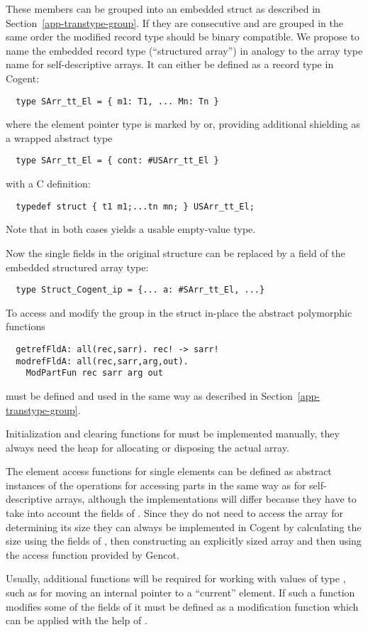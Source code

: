 These members can be grouped into an embedded struct as described in Section~\ref{app-transtype-group}. If they
are consecutive and are grouped in the same order the modified record type should be binary compatible.
We propose to name the embedded record type  (``structured array'') in analogy to the
array type name for self-descriptive arrays. It can either be defined as a record type in Cogent:
\begin{verbatim}
  type SArr_tt_El = { m1: T1, ... Mn: Tn }
\end{verbatim}
where the element pointer type  is marked by 
or, providing additional shielding as a wrapped abstract type 
\begin{verbatim}
  type SArr_tt_El = { cont: #USArr_tt_El }
\end{verbatim}
with a C definition:
\begin{verbatim}
  typedef struct { t1 m1;...tn mn; } USArr_tt_El;
\end{verbatim}
Note that in both cases  yields a usable empty-value type.

Now the single fields in the original structure can be replaced by a field of the embedded structured array type:
\begin{verbatim}
  type Struct_Cogent_ip = {... a: #SArr_tt_El, ...}
\end{verbatim}

To access and modify the group in the struct in-place the abstract polymorphic functions
\begin{verbatim}
  getrefFldA: all(rec,sarr). rec! -> sarr!
  modrefFldA: all(rec,sarr,arg,out). 
    ModPartFun rec sarr arg out 
\end{verbatim}
must be defined and used in the same way as described in Section~\ref{app-transtype-group}.

Initialization and clearing functions for  must be implemented manually, they always need the
heap for allocating or disposing the actual array. 

The element access functions for single elements can be defined as abstract instances of the operations for accessing parts 
in the same way as for self-descriptive arrays, although the implementations will differ because they have to 
take into account the fields of . Since they do not need to access the array for determining its size
they can always be implemented in Cogent by calculating the size using the fields of , then constructing
an explicitly sized array and then using the access function provided by Gencot.

Usually, additional functions will be required for working
with values of type , such as for moving an internal pointer to a ``current'' element.
If such a function modifies some of the fields of  it must be defined as a modification function
which can be applied with the help of .
